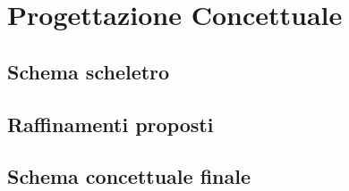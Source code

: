 \chapter{Progettazione Concettuale}
\section{Schema scheletro}
\section{Raffinamenti proposti}
\section{Schema concettuale finale}